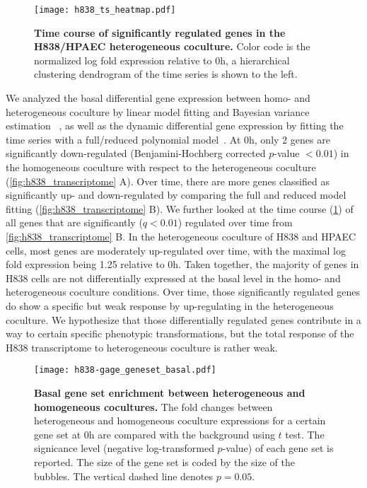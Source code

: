 \begin{figure}[!ht]
\begin{center}
\texttt{[image: h838\_ts\_heatmap.pdf]}
\end{center}
\caption[Gene expression time course in the H838/HPAEC coculture]{
{\bf Time course of significantly regulated genes in the H838/HPAEC heterogeneous coculture.} 
Color code is the normalized log fold expression relative to 0h, a hierarchical
clustering dendrogram of the time series is shown to the left.
}
\label{fig:h838_ts}
\end{figure}

We analyzed the basal differential gene expression between homo- and
heterogeneous coculture by linear model fitting and Bayesian variance estimation~%
\citep{Smyth2004}, as well as the dynamic differential gene expression by fitting
the time series with a full/reduced polynomial model~\citep{Mar2009}. At 0h, only 2
genes are significantly down-regulated (Benjamini-Hochberg
corrected $p$-value $<0.01$) in the homogeneous coculture with respect
to the heterogeneous coculture 
(\ref{fig:h838_transcriptome} A). Over time, there are more
genes classified as significantly up- and down-regulated by comparing the full and
reduced model fitting (\ref{fig:h838_transcriptome} B). 
We further looked at the time course (\ref{fig:h838_ts}) 
of all genes that are
significantly ($q<0.01$) regulated over time from 
\ref{fig:h838_transcriptome} B. In the heterogeneous
coculture of H838 and HPAEC cells, most genes are 
moderately up-regulated over time, with the maximal
log fold expression being 1.25 relative to 0h.
Taken together, the majority of genes
in H838 cells are not differentially expressed at the basal
level in the homo- and heterogeneous
coculture conditions. 
Over time, those significantly regulated genes do show
a specific but weak response by up-regulating in the 
heterogeneous coculture.
We hypothesize that those 
differentially regulated genes contribute in a way 
to certain specific
phenotypic transformations, but the total response of the H838
transcriptome to heterogeneous coculture is rather weak.

\begin{figure}[!ht]
\begin{center}
\texttt{[image: h838-gage\_geneset\_basal.pdf]}
\end{center}
\caption[Basal gene set enrichment]{
{\bf Basal gene set enrichment between heterogeneous and homogeneous cocultures.} 
The fold changes between heterogeneous and homogeneous coculture expressions 
for a certain gene set at 0h are compared with the background using $t$ test.
The signicance level (negative log-transformed $p$-value) of
each gene set is reported. The size
of the gene set is coded by the size of the bubbles.
The vertical dashed line denotes $p=0.05$.
}
\label{fig:h838_basal_gage_msigdb}
\end{figure}

